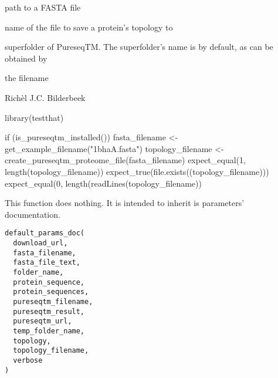 \documentclass[letterpaper]{book}
\begin{document}
%
\begin{Arguments}
\begin{ldescription}
\item[\code{fasta\_filename}] path to a FASTA file

\item[\code{topology\_filename}] name of the file to save a protein's
topology to

\item[\code{folder\_name}] superfolder of PureseqTM.
The superfolder's name is 
by default, as can be obtained by
\end{ldescription}
\end{Arguments}
%
\begin{Value}
the filename
\end{Value}
%
\begin{Author}\relax
Richèl J.C. Bilderbeek
\end{Author}
%
\begin{Examples}
\begin{ExampleCode}
library(testthat)

if (is_pureseqtm_installed()) {
  fasta_filename <- get_example_filename("1bhaA.fasta")
  topology_filename <- create_pureseqtm_proteome_file(fasta_filename)
  expect_equal(1, length(topology_filename))
  expect_true(file.exists((topology_filename)))
  expect_equal(0, length(readLines(topology_filename)) %
}
\end{ExampleCode}
\end{Examples}
%
\begin{Description}\relax
This function does nothing. It is intended to inherit is parameters'
documentation.
\end{Description}
%
\begin{Usage}
\begin{verbatim}
default_params_doc(
  download_url,
  fasta_filename,
  fasta_file_text,
  folder_name,
  protein_sequence,
  protein_sequences,
  pureseqtm_filename,
  pureseqtm_result,
  pureseqtm_url,
  temp_folder_name,
  topology,
  topology_filename,
  verbose
)
\end{verbatim}
\end{Usage}
%
\end{document}

